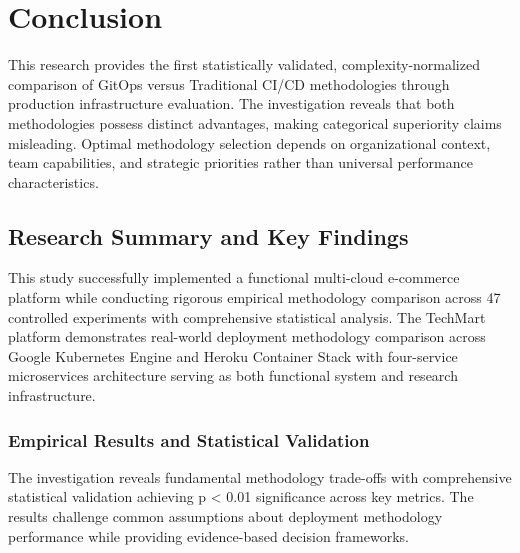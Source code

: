 \chapter{Conclusion}
\label{ch:conclusion}

This research provides the first statistically validated, complexity-normalized comparison of GitOps versus Traditional CI/CD methodologies through production infrastructure evaluation. The investigation reveals that both methodologies possess distinct advantages, making categorical superiority claims misleading. Optimal methodology selection depends on organizational context, team capabilities, and strategic priorities rather than universal performance characteristics.

\section{Research Summary and Key Findings}
\label{sec:research_summary}

This study successfully implemented a functional multi-cloud e-commerce platform while conducting rigorous empirical methodology comparison across 47 controlled experiments with comprehensive statistical analysis. The TechMart platform demonstrates real-world deployment methodology comparison across Google Kubernetes Engine and Heroku Container Stack with four-service microservices architecture serving as both functional system and research infrastructure.

\subsection{Empirical Results and Statistical Validation}
\label{subsec:empirical_results}

The investigation reveals fundamental methodology trade-offs with comprehensive statistical validation achieving p < 0.01 significance across key metrics. The results challenge common assumptions about deployment methodology performance while providing evidence-based decision frameworks.

